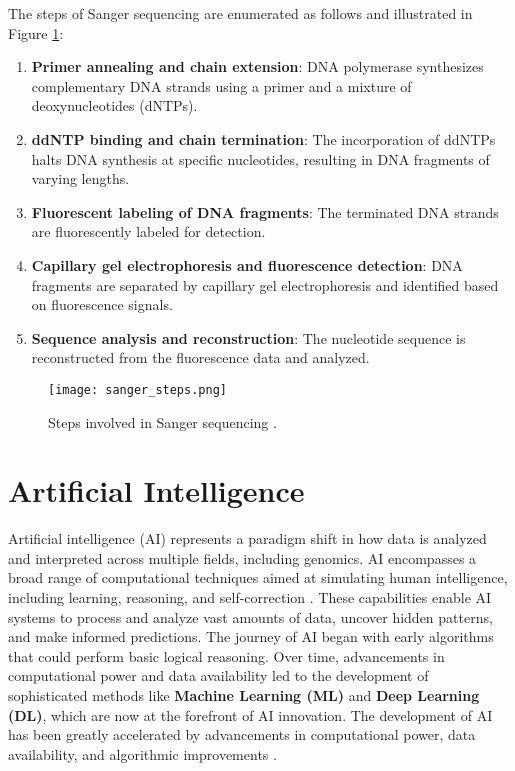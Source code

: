The steps of Sanger sequencing are enumerated as follows and illustrated in Figure \ref{fig:sanger_steps}: 
\begin{enumerate} 
\item \textbf{Primer annealing and chain extension}: DNA polymerase synthesizes complementary DNA strands using a primer and a mixture of deoxynucleotides (dNTPs). 
\item \textbf{ddNTP binding and chain termination}: The incorporation of ddNTPs halts DNA synthesis at specific nucleotides, resulting in DNA fragments of varying lengths. 
\item \textbf{Fluorescent labeling of DNA fragments}: The terminated DNA strands are fluorescently labeled for detection. 
\item \textbf{Capillary gel electrophoresis and fluorescence detection}: DNA fragments are separated by capillary gel electrophoresis and identified based on fluorescence signals. 
\item \textbf{Sequence analysis and reconstruction}: The nucleotide sequence is reconstructed from the fluorescence data and analyzed. 
\end{enumerate}

\begin{figure}[H]
\centering
\texttt{[image: sanger\_steps.png]}
\caption{Steps involved in Sanger sequencing \cite{biotechreality_sanger_steps}.}
\label{fig:sanger_steps}
\end{figure}

\section{Artificial Intelligence}
Artificial intelligence (AI) represents a paradigm shift in how data is analyzed and interpreted across multiple fields, including genomics. AI encompasses a broad range of computational techniques aimed at simulating human intelligence, including learning, reasoning, and self-correction \cite{russell2010artificial}. These capabilities enable AI systems to process and analyze vast amounts of data, uncover hidden patterns, and make informed predictions.
The journey of AI began with early algorithms that could perform basic logical reasoning. Over time, advancements in computational power and data availability led to the development of sophisticated methods like \textbf{Machine Learning (ML)} and \textbf{Deep Learning (DL)}, which are now at the forefront of AI innovation.
The development of AI has been greatly accelerated by advancements in computational power, data availability, and algorithmic improvements \cite{brynjolfsson2014second}. 

